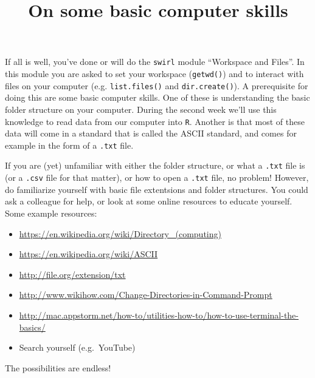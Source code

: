 \documentclass[]{article}
\title{On some basic computer skills}
\author{}
\date{}
\providecommand{\tightlist}{%
  \setlength{\itemsep}{0pt}\setlength{\parskip}{0pt}}
\begin{document}
\maketitle

If all is well, you've done or will do the \texttt{swirl} module
``Workspace and Files''. In this module you are asked to set your
workspace (\texttt{getwd()}) and to interact with files on your computer
(e.g. \texttt{list.files()} and \texttt{dir.create()}). A prerequisite
for doing this are some basic computer skills. One of these is
understanding the basic folder structure on your computer. During the
second week we'll use this knowledge to read data from our computer into
\texttt{R}. Another is that most of these data will come in a standard
that is called the ASCII standard, and comes for example in the form of
a \texttt{.txt} file.

If you are (yet) unfamiliar with either the folder structure, or what a
\texttt{.txt} file is (or a \texttt{.csv} file for that matter), or how
to open a \texttt{.txt} file, no problem! However, do familiarize
yourself with basic file extentsions and folder structures. You could
ask a colleague for help, or look at some online resources to educate
yourself. Some example resources:

\begin{itemize}
\tightlist
\item
  \url{https://en.wikipedia.org/wiki/Directory_(computing)}
\item
  \url{https://en.wikipedia.org/wiki/ASCII}
\item
  \url{http://file.org/extension/txt}
\item
  \url{http://www.wikihow.com/Change-Directories-in-Command-Prompt}
\item
  \url{http://mac.appstorm.net/how-to/utilities-how-to/how-to-use-terminal-the-basics/}
\item
  Search yourself (e.g.~YouTube)
\end{itemize}

The possibilities are endless!
\end{document}
